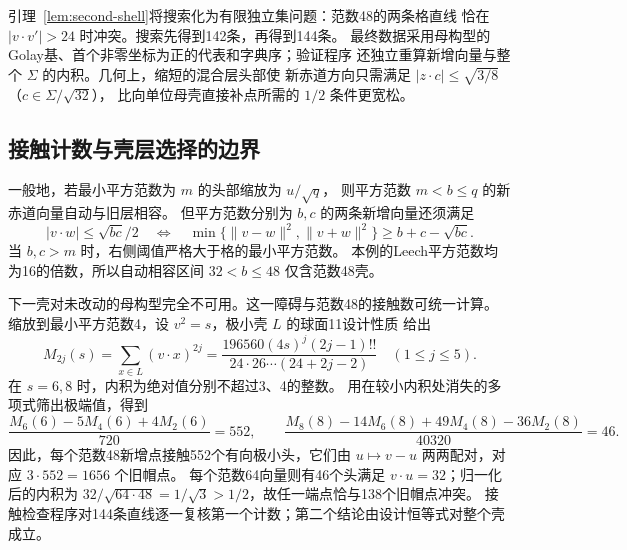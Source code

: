 引理~\ref{lem:second-shell}将搜索化为有限独立集问题：范数48的两条格直线
恰在 $|v\cdot v'|>24$ 时冲突。搜索先得到142条，再得到144条。
最终数据采用母构型的Golay基、首个非零坐标为正的代表和字典序；验证程序
还独立重算新增向量与整个 $\Sigma$ 的内积。几何上，缩短的混合层头部使
新赤道方向只需满足 $|z\cdot c|\le\sqrt{3/8}$（$c\in\Sigma/\sqrt{32}$），
比向单位母壳直接补点所需的 $1/2$ 条件更宽松。

\subsection{接触计数与壳层选择的边界}

一般地，若最小平方范数为 $m$ 的头部缩放为 $u/\sqrt q$，
则平方范数 $m<b\le q$ 的新赤道向量自动与旧层相容。
但平方范数分别为 $b,c$ 的两条新增向量还须满足
\[
|v\cdot w|\le\sqrt{bc}/2
\quad\Longleftrightarrow\quad
\min\{\|v-w\|^2,\|v+w\|^2\}\ge b+c-\sqrt{bc}.
\]
当 $b,c>m$ 时，右侧阈值严格大于格的最小平方范数。
本例的Leech平方范数均为16的倍数，所以自动相容区间 $32<b\le48$
仅含范数48壳。

下一壳对未改动的母构型完全不可用。这一障碍与范数48的接触数可统一计算。
缩放到最小平方范数4，设 $v^2=s$，极小壳 $L$ 的球面11设计性质
\cite{nebe-designs}给出
\[
M_{2j}(s)=\sum_{x\in L}(v\cdot x)^{2j}
=\frac{196560(4s)^j(2j-1)!!}{24\cdot26\cdots(24+2j-2)}
\quad(1\le j\le5).
\]
在 $s=6,8$ 时，内积为绝对值分别不超过3、4的整数。
用在较小内积处消失的多项式筛出极端值，得到
\[
\frac{M_6(6)-5M_4(6)+4M_2(6)}{720}=552,\qquad
\frac{M_8(8)-14M_6(8)+49M_4(8)-36M_2(8)}{40320}=46.
\]
因此，每个范数48新增点接触552个有向极小头，它们由 $u\mapsto v-u$
两两配对，对应 $3\cdot552=1656$ 个旧帽点。
每个范数64向量则有46个头满足 $v\cdot u=32$；归一化后的内积为
$32/\sqrt{64\cdot48}=1/\sqrt3>1/2$，故任一端点恰与138个旧帽点冲突。
接触检查程序对144条直线逐一复核第一个计数；第二个结论由设计恒等式对整个壳成立。
